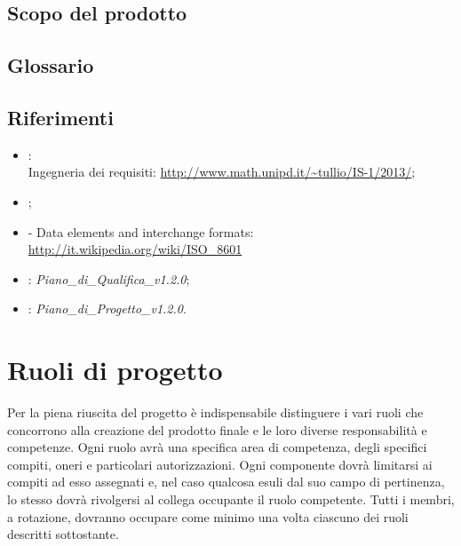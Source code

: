 \subsection{Scopo del prodotto}
\label{1.2}
\Prodotto{}

\subsection{Glossario}%
\label{1.3}
\Glossario{}

\subsection{Riferimenti} %
\label{1.4}

\begin{itemize}
\item {}:\\
Ingegneria dei requisiti: \url{http://www.math.unipd.it/~tullio/IS-1/2013/};
\item {};\\
\item {} - Data elements and interchange formats: \url{http://it.wikipedia.org/wiki/ISO\_8601}
\item {}: \emph{Piano\_di\_Qualifica\_v1.2.0};
\item {}: \emph{Piano\_di\_Progetto\_v1.2.0}.
\end{itemize}

\newpage
\section{Ruoli di progetto}%
\label{2}
Per la piena riuscita del progetto è indispensabile distinguere i vari ruoli che concorrono alla creazione del prodotto finale e le loro diverse responsabilità e competenze.
Ogni ruolo avrà una specifica area di competenza, degli specifici compiti, oneri e particolari autorizzazioni. Ogni componente dovrà limitarsi ai compiti ad esso assegnati e, nel caso qualcosa esuli dal suo campo di pertinenza, lo stesso dovrà rivolgersi al collega occupante il ruolo competente.
Tutti i membri, a rotazione, dovranno occupare come minimo una volta ciascuno dei ruoli descritti sottostante.

